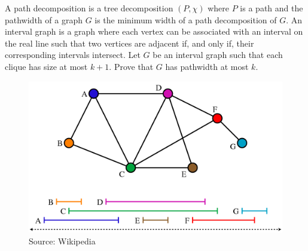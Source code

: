 \documentclass{article}
\begin{document}
\begin{exercise}
    A path decomposition is a tree decomposition $(P,\chi)$ where $P$ is a path and the pathwidth of a graph $G$ is the minimum width of a path decomposition of $G$. An interval graph is a graph where each vertex can be associated with an interval on the real line such that two vertices are adjacent if, and only if, their corresponding intervals intersect. Let $G$ be an interval graph such that each clique has size at most $k+1$. Prove that $G$ has pathwidth at most $k$.
\end{exercise}
\begin{solving}
    \begin{figure}[H]
        \centering
        \includegraphics[scale = .3]{4/exercise/intervalgraph.png}
        \caption{Source: Wikipedia}
        \label{fig:my_label}
    \end{figure}


\end{solving}
\end{document}
